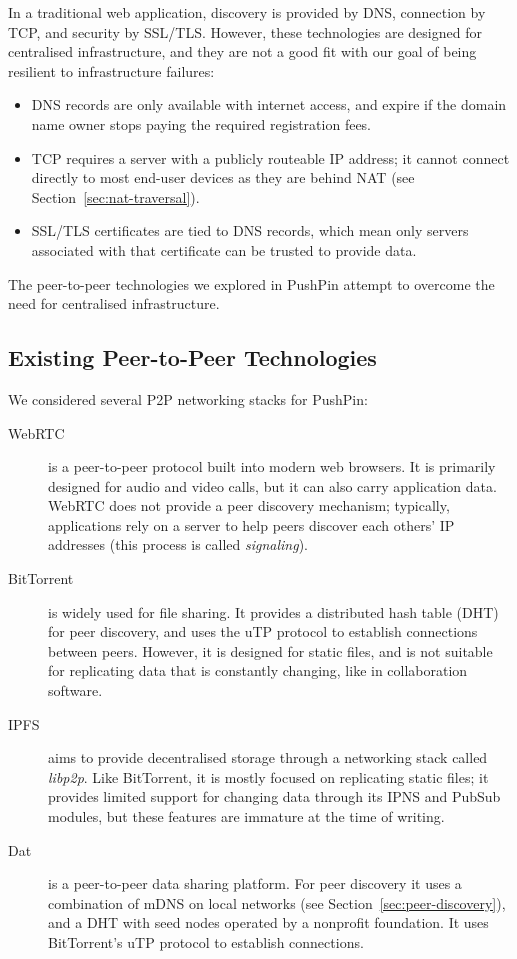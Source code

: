 \documentclass[sigplan,10pt]{acmart}
\begin{document}
In a traditional web application, discovery is provided by DNS, connection by TCP, and security by SSL/TLS.
However, these technologies are designed for centralised infrastructure, and they are not a good fit with our goal of being resilient to infrastructure failures:
\begin{itemize}
    \item DNS records are only available with internet access, and expire if the domain name owner stops paying the required registration fees.
    \item TCP requires a server with a publicly routeable IP address; it cannot connect directly to most end-user devices as they are behind NAT (see Section~\ref{sec:nat-traversal}).
    \item SSL/TLS certificates are tied to DNS records, which mean only servers associated with that certificate can be trusted to provide data.
\end{itemize}

The peer-to-peer technologies we explored in PushPin attempt to overcome the need for centralised infrastructure.

\subsection{Existing Peer-to-Peer Technologies}\label{sec:existing-p2p}

We considered several P2P networking stacks for PushPin:
\begin{description}
\item[WebRTC] is a peer-to-peer protocol built into modern web browsers.
It is primarily designed for audio and video calls, but it can also carry application data.
WebRTC does not provide a peer discovery mechanism; typically, applications rely on a server to help peers discover each others' IP addresses (this process is called \emph{signaling}).
\item[BitTorrent] is widely used for file sharing.
It provides a distributed hash table (DHT) for peer discovery, and uses the uTP protocol to establish connections between peers.
However, it is designed for static files, and is not suitable for replicating data that is constantly changing, like in collaboration software.
\item[IPFS] aims to provide decentralised storage through a networking stack called \emph{libp2p}.
Like BitTorrent, it is mostly focused on replicating static files; it provides limited support for changing data through its IPNS and PubSub modules, but these features are immature at the time of writing.
\item[Dat] \cite{HowDatWorks,Ogden:2018ur} is a peer-to-peer data sharing platform.
For peer discovery it uses a combination of mDNS on local networks (see Section~\ref{sec:peer-discovery}), and a DHT with seed nodes operated by a nonprofit foundation. It uses BitTorrent's uTP protocol to establish connections.
\end{description}
\end{document}
